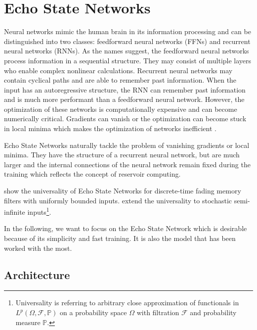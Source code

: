 \section{Echo State Networks}
\label{CH:ESN}

Neural networks mimic the human brain in its information processing and can be distinguished into two classes: feedforward neural networks (FFNs) and recurrent neural networks (RNNs). As the names suggest, the feedforward neural networks process information in a sequential structure. They may consist of multiple layers who enable complex nonlinear calculations. Recurrent neural networks may contain cyclical paths and are able to remember past information. When the input has an autoregressive structure, the RNN can remember past information and is much more performant than a feedforward neural network. However, the optimization of these networks is computationally expensive and can become numerically critical. Gradients can vanish or the optimization can become stuck in local minima which makes the optimization of networks inefficient \citep{Bengio1994}.

Echo State Networks naturally tackle the problem of vanishing gradients or local minima. They have the structure of a recurrent neural network, but are much larger and the internal connections of the neural network remain fixed during the training which reflects the concept of reservoir computing.

\cite{Grigortega2018Univeral} show the universality of Echo State Networks for discrete-time fading memory filters with uniformly bounded inputs. \cite{Ortega2018UniversalityStochInput} extend the universality to stochastic semi-infinite inputs\footnote{Universality is referring to arbitrary close approximation of functionals in $L^p(\Omega, \mathcal{F}, \mathbb{P})$ on a probability space $\Omega$ with filtration $\mathcal{F}$ and probability measure $\mathbb{P}$.}.

In the following, we want to focus on the Echo State Network which is desirable because of its simplicity and fast training. It is also the model that has been worked with the most.

\subsection{Architecture}
\label{CH:ESN:Architecture}

